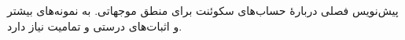 \documentclass[../../../include/open-logic-chapter]{subfiles}
\begin{document}
\begin{editorial}
  پیش‌نویس فصلی دربارهٔ حساب‌های سکوئنت برای منطق موجهاتی. به نمونه‌های
  بیشتر و اثبات‌های درستی و تمامیت نیاز دارد.
\end{editorial}


\OLEndChapterHook
\end{document}
